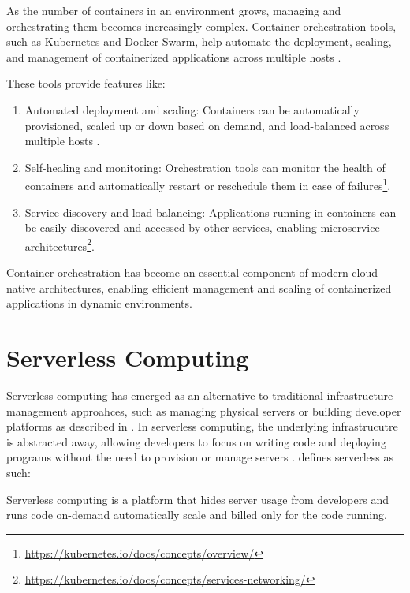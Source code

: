 \documentclass[
  table]{report}
\providecommand{\tightlist}{%
  \setlength{\itemsep}{0pt}\setlength{\parskip}{0pt}}
\begin{document}
As the number of containers in an environment grows, managing and
orchestrating them becomes increasingly complex. Container orchestration
tools, such as Kubernetes and Docker Swarm, help automate the
deployment, scaling, and management of containerized applications across
multiple hosts \citep{burnsBorgOmegaKubernetes2016}.

These tools provide features like:

\begin{enumerate}
\def\labelenumi{\arabic{enumi}.}
\tightlist
\item
  Automated deployment and scaling: Containers can be automatically
  provisioned, scaled up or down based on demand, and load-balanced
  across multiple hosts \citep{burnsBorgOmegaKubernetes2016}.
\item
  Self-healing and monitoring: Orchestration tools can monitor the
  health of containers and automatically restart or reschedule them in
  case of failures\footnote{\url{https://kubernetes.io/docs/concepts/overview/}}.
\item
  Service discovery and load balancing: Applications running in
  containers can be easily discovered and accessed by other services,
  enabling microservice architectures\footnote{\url{https://kubernetes.io/docs/concepts/services-networking/}}.
\end{enumerate}

Container orchestration has become an essential component of modern
cloud-native architectures, enabling efficient management and scaling of
containerized applications in dynamic environments.

\section{Serverless Computing}

Serverless computing has emerged as an alternative to traditional
infrastructure management approahces, such as managing physical servers
or building developer platforms as described in 
\citep{baldiniServerlessComputingCurrent2017}. In serverless computing,
the underlying infrastrucutre is abstracted away, allowing developers to
focus on writing code and deploying programs without the need to
provision or manage servers
\citep{baldiniServerlessComputingCurrent2017,robertsServerlessArchitectures2018}.
\citet{castroRiseServerlessComputing2019} defines serverless as such:

\begin{tcolorbox}[
  definitionstyle,
  title=Serverless definition,
]
Serverless computing is a platform that hides server usage from
developers and runs code on-demand automatically scale and billed only for the
code running. \\

\hfill \citep{castroRiseServerlessComputing2019}

\end{tcolorbox}
\end{document}
